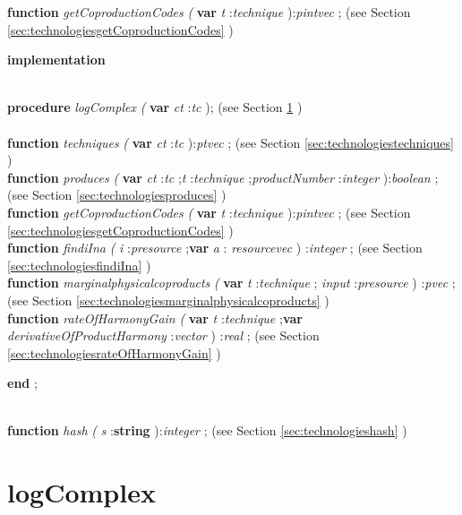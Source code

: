 \begin{tabbing}
\<\textsf{\textbf{function}  \textit{getCoproductionCodes} \textit{(} \textbf{var}  \textit{t}  :\textit{technique} ):\textit{pintvec} ;} (see Section \ref{sec:technologiesgetCoproductionCodes} )\\
\<\parbox{14cm}{\textsf{\textbf{implementation} }}\\
\<\textsf{\textbf{procedure}  \textit{logComplex} \textit{(} \textbf{var}  \textit{ct} :\textit{tc} );} (see Section \ref{sec:technologieslogComplex} )\\
\\
\<\textsf{\textbf{function}   \textit{techniques} \textit{(} \textbf{var}  \textit{ct} :\textit{tc} ):\textit{ptvec} ;} (see Section \ref{sec:technologiestechniques} )\\
\<\textsf{\textbf{function}   \textit{produces} \textit{(} \textbf{var}  \textit{ct} :\textit{tc} ;\textit{t}  :\textit{technique} ;\textit{productNumber} :\textit{integer} ):\textit{boolean} ;} (see Section \ref{sec:technologiesproduces} )\\
\<\textsf{\textbf{function}  \textit{getCoproductionCodes} \textit{(} \textbf{var}  \textit{t}  :\textit{technique} ):\textit{pintvec} ;} (see Section \ref{sec:technologiesgetCoproductionCodes} )\\
\<\textsf{\textbf{function}  \textit{findiIna} \textit{(}   \textit{i} :\textit{presource} ;\textbf{var}  \textit{a} : \textit{resourcevec} ) :\textit{integer} ;} (see Section \ref{sec:technologiesfindiIna} )\\
\<\textsf{\textbf{function}   \textit{marginalphysicalcoproducts} \textit{(} \textbf{var}  \textit{t} :\textit{technique} ;    \textit{input} :\textit{presource} ) :\textit{pvec} ;} (see Section \ref{sec:technologiesmarginalphysicalcoproducts} )\\
\<\textsf{\textbf{function}   \textit{rateOfHarmonyGain} \textit{(} \textbf{var}  \textit{t} :\textit{technique} ;\textbf{var}  \textit{derivativeOfProductHarmony} :\textit{vector} ) :\textit{real} ;} (see Section \ref{sec:technologiesrateOfHarmonyGain} )\\
\<\-\parbox{14cm}{\textsf{\textbf{end} ;}}\\
\<\textsf{\textbf{function}  \textit{hash} \textit{(} \textit{s} :\textbf{string} ):\textit{integer} ;} (see Section \ref{sec:technologieshash} )\\
\end{tabbing}
\section{logComplex}\label{sec:technologieslogComplex}

